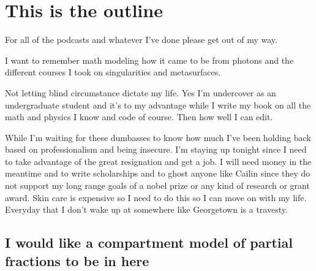 \chapter{This is the outline}

For all of the podcasts and whatever I've done please get out of my way. 

I want to remember math modeling how it came to be from photons and the different courses I took on singularities and metasurfaces. 


Not letting blind circumstance dictate my life. Yes I'm undercover as an undergraduate student and it's to my advantage while I write my book on all the math and physics I know and code of course. Then how well I can edit. 


While I'm waiting for these dumbasses to know how much I've been holding back based on professionalism and being insecure. I'm staying up tonight since I need to take advantage of the great resignation and get a job. I will need money in the meantime and to write scholarships and to ghost anyone like Cailin since they do not support my long range goals of a nobel prize or any kind of research or grant award. Skin care is expensive so I need to do this so I can move on with my life. Everyday that I don't wake up at somewhere like Georgetown is a travesty.   

\section{I would like a compartment model of partial fractions to be in here}